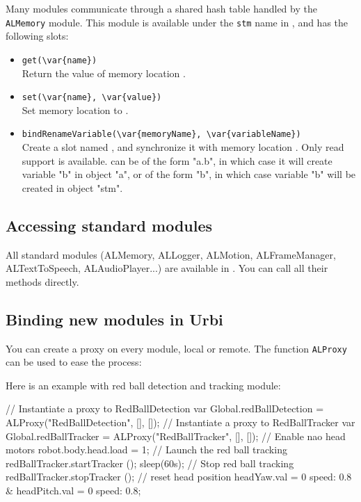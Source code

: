 Many \naoqi modules communicate through a shared hash table handled by
the \lstinline|ALMemory| module. This module is available under the
\lstinline|stm| name in \urbi, and has the following slots:

\begin{itemize}
\item \lstinline|get(\var{name})| \\
  Return the value of memory location .
\item \lstinline|set(\var{name}, \var{value})| \\
  Set memory location  to .
\item \lstinline|bindRenameVariable(\var{memoryName}, \var{variableName})| \\
  Create a \us slot named , and synchronize it with memory
  location . Only read support is available.
   can be of the form "a.b", in which case it will create
  variable "b" in object "a", or of the form "b", in which case variable "b"
  will be created in object "stm".
\end{itemize}

\subsection{Accessing standard \naoqi modules}

All standard \naoqi modules (ALMemory, ALLogger, ALMotion, ALFrameManager,
ALTextToSpeech, ALAudioPlayer...) are available in \urbi. You can call all
their methods directly.

\subsection{Binding new \naoqi modules in Urbi}

You can create a proxy on every \naoqi module, local or remote. The function
\lstinline|ALProxy| can be used to ease the process:

Here is an example with red ball detection and tracking module:
\begin{urbiunchecked}
// Instantiate a proxy to RedBallDetection
var Global.redBallDetection = ALProxy("RedBallDetection", [], []);
// Instantiate a proxy to RedBallTracker
var Global.redBallTracker = ALProxy("RedBallTracker", [], []);
// Enable nao head motors
robot.body.head.load = 1;
// Launch the red ball tracking
redBallTracker.startTracker ();
sleep(60s);
// Stop red ball tracking
redBallTracker.stopTracker ();
// reset head position
headYaw.val = 0 speed: 0.8 & headPitch.val = 0 speed: 0.8;
\end{urbiunchecked}

